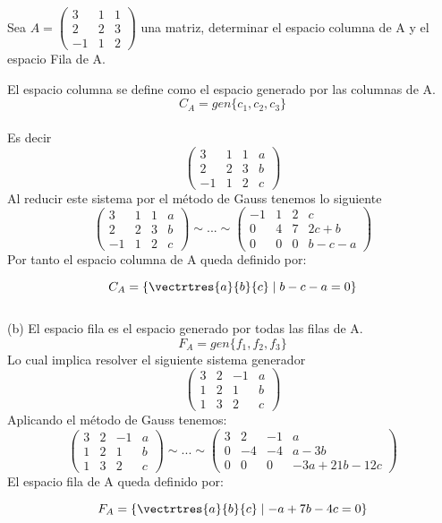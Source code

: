 \begin{ejercicio}
Sea $A=
\left(
\begin{array}{rrr}
3&1&1\\
2&2&3\\
-1&1&2
\end{array}
\right)$ una matriz, determinar el espacio columna de A y el espacio Fila de A.


\sol
El espacio columna se define como el espacio generado por las columnas de A.
\[C_A=gen\{c_1, c_2, c_3\}\]
~\\
Es decir
$$\left(
\begin{array}{rrr|r}
3&1&1&a\\
2&2&3&b\\
-1&1&2&c
\end{array}
\right)$$
Al reducir este sistema por el método de Gauss tenemos lo siguiente
$$\left(
\begin{array}{rrr|r}
3&1&1&a\\
2&2&3&b\\
-1&1&2&c
\end{array}
\right)
\sim ... \sim
\left(
\begin{array}{rrr|r}
-1&1&2&c\\
0&4&7&2c+b\\
0&0&0&b-c-a
\end{array}
\right)$$
 Por tanto el espacio columna de A queda definido por:
 
 \[C_A=\left\lbrace  \vectrtres{a}{b}{c} \mid b-c-a=0 \right\rbrace  \]
~\\
(b) El espacio fila es el espacio generado por todas las filas de A. 
\[F_A=gen\{f_1, f_2, f_3\}\]
Lo cual implica resolver el siguiente sistema generador
$$\left(
\begin{array}{rrr|r}
3&2&-1&a\\
1&2&1&b\\
1&3&2&c
\end{array}
\right)$$
Aplicando el método de Gauss tenemos:
$$\left(
\begin{array}{rrr|r}
3&2&-1&a\\
1&2&1&b\\
1&3&2&c
\end{array}
\right)
\sim ...\sim
\left(
\begin{array}{rrr|r}
3&2&-1&a\\
0&-4&-4&a-3b\\
0&0&0&-3a+21b-12c
\end{array}
\right)
$$
El espacio fila de A queda definido por:
 
 \[F_A=\left\lbrace  \vectrtres{a}{b}{c} \mid -a+7b-4c=0 \right\rbrace  \]



\end{ejercicio}


